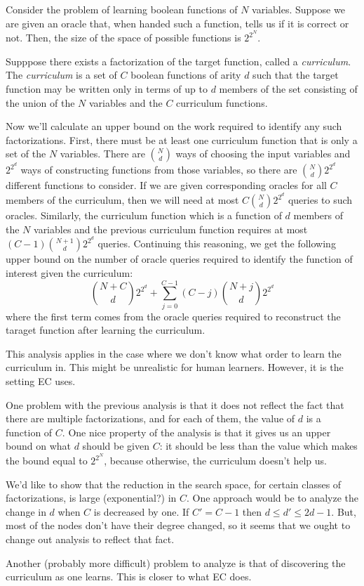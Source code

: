 \documentclass{article}
\begin{document}
Consider the problem of learning boolean functions of $N$ variables.
Suppose we are given an oracle that, when handed such a function, tells us if it is correct or not.
Then, the size of the space of possible functions is $2^{2^N}$.

Supppose there exists a factorization of the target function, called a \emph{curriculum}.
The \emph{curriculum} is a set of $C$ boolean functions of arity $d$ such that the target function may be written only in terms of up to $d$ members of the set consisting of the union of the $N$ variables and the $C$ curriculum functions.

Now we'll calculate an upper bound on the work required to identify any such factorizations.
First, there must be at least one curriculum function that is only a set of the $N$ variables.
There are $\binom{N}{d}$ ways of choosing the input variables and $2^{2^d}$ ways of constructing functions from those variables, so there are $\binom{N}{d}2^{2^d}$ different functions to consider.
If we are given corresponding oracles for all $C$ members of the curriculum, then we will need at most $C\binom{N}{d}2^{2^d}$ queries to such oracles.
Similarly, the curriculum function which is a function of $d$ members of the $N$ variables and the previous curriculum function requires at most $(C-1)\binom{N+1}{d}2^{2^d}$ queries.
Continuing this reasoning, we get the following upper bound on the number of oracle queries required to identify the function of interest given the curriculum:
$$
\binom{N+C}{d}2^{2^d} + \sum_{j=0}^{C-1} (C-j) \binom{N+j}{d} 2^{2^d}
$$
where the first term comes from the oracle queries required to reconstruct the taraget function after learning the curriculum.

This analysis applies in the case where we don't know what order to learn the curriculum in. This might be unrealistic for human learners.
However, it is the setting EC uses.

One problem with the previous analysis is that it does not reflect the fact that there are multiple factorizations, and for each of them, the value of $d$ is a function of $C$.
One nice property of the analysis is that it gives us an upper bound on what $d$ should be given $C$: it should be less than the value which makes the bound equal to $2^{2^N}$, because otherwise, the curriculum doesn't help us.

We'd like to show that the reduction in the search space, for certain classes of factorizations, is large (exponential?) in $C$.
One approach would be to analyze the change in $d$ when $C$ is decreased by one.
If $C'=C-1$ then $d\leq d'\leq 2d-1$.
But, most of the nodes don't have their degree changed, so it seems that we ought to change out analysis to reflect that fact.

Another (probably more difficult) problem to analyze is that of discovering the curriculum as one learns.
This is closer to what EC does.
\end{document}
